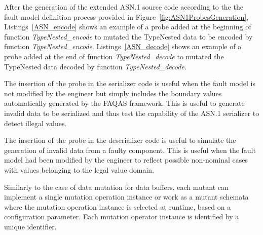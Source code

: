 


After the generation of the extended ASN.1 source code according to the 
the fault model definition process provided in Figure~\ref{fig:ASN1ProbesGeneration}, 
Listings~\ref{ASN_encode} shows an example of a probe added at the beginning of function \emph{TypeNested\_encode} to mutated the TypeNested data to be encoded by function \emph{TypeNested\_encode}.
Listings~\ref{ASN_decode} shows an example of a probe added 
at the end of function \emph{TypeNested\_decode}
to mutated the TypeNested data decoded by function \emph{TypeNested\_decode}.

The insertion of the probe in the serializer code is useful when the fault model is not modified by the engineer but simply includes the boundary values automatically generated by the FAQAS framework. 
This is useful to generate invalid data to be serialized and thus test the capability of the ASN.1 serializer to detect illegal values.

The insertion of the probe in the deserializer code is useful to simulate the generation of invalid data from a faulty component. This is useful when the fault model had been modified by the engineer to reflect possible non-nominal cases with values belonging to the legal value domain.


Similarly to the case of data mutation for data buffers, each mutant can implement a single mutation operation instance or work as a mutant schemata where the mutation operation instance is selected at runtime, based on a configuration parameter. Each mutation operator instance is identified by a unique identifier. 


